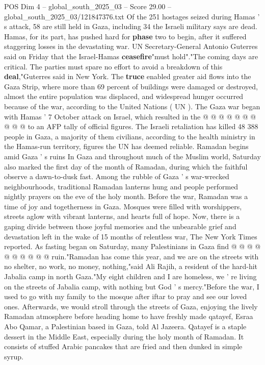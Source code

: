 \begin{textsample}{POS Dim 4 – global\_south\_2025\_03 – Score 29.00 – global\_south\_2025\_03/121847376.txt}
Of the 251 hostages seized during Hamas ' s attack, 58 are still held in Gaza, including 34 the Israeli military says are dead.
Hamas, for its part, has pushed hard for \textbf{phase} two to begin, after it suffered staggering losses in the devastating war.
UN Secretary-General Antonio Guterres said on Friday that the Israel-Hamas \textbf{ceasefire}"must hold"."The coming days are critical.
The parties must spare no effort to avoid a breakdown of this \textbf{deal},"Guterres said in New York.
The \textbf{truce} enabled greater aid flows into the Gaza Strip, where more than 69 percent of buildings were damaged or destroyed, almost the entire population was displaced, and widespread hunger occurred because of the war, according to the United Nations ( UN ).
The Gaza war began with Hamas ' 7 October attack on Israel, which resulted in the @ @ @ @ @ @ @ @ @ @ to an AFP tally of official figures.
The Israeli retaliation has killed 48 388 people in Gaza, a majority of them civilians, according to the health ministry in the Hamas-run territory, figures the UN has deemed reliable.
Ramadan begins amid Gaza ' s ruins In Gaza and throughout much of the Muslim world, Saturday also marked the first day of the month of Ramadan, during which the faithful observe a dawn-to-dusk fast.
Among the rubble of Gaza ' s war-wrecked neighbourhoods, traditional Ramadan lanterns hung and people performed nightly prayers on the eve of the holy month.
Before the war, Ramadan was a time of joy and togetherness in Gaza.
Mosques were filled with worshippers, streets aglow with vibrant lanterns, and hearts full of hope.
Now, there is a gaping divide between those joyful memories and the unbearable grief and devastation left in the wake of 15 months of relentless war, The New York Times reported.
As fasting began on Saturday, many Palestinians in Gaza find @ @ @ @ @ @ @ @ @ @ ruin."Ramadan has come this year, and we are on the streets with no shelter, no work, no money, nothing,"said Ali Rajih, a resident of the hard-hit Jabalia camp in north Gaza."My eight children and I are homeless, we ' re living on the streets of Jabalia camp, with nothing but God ' s mercy."Before the war, I used to go with my family to the mosque after iftar to pray and see our loved ones.
Afterwards, we would stroll through the streets of Gaza, enjoying the lively Ramadan atmosphere before heading home to have freshly made qatayef, Esraa Abo Qamar, a Palestinian based in Gaza, told Al Jazeera.
Qatayef is a staple dessert in the Middle East, especially during the holy month of Ramadan.
It consists of stuffed Arabic pancakes that are fried and then dunked in simple syrup.

\end{textsample}
